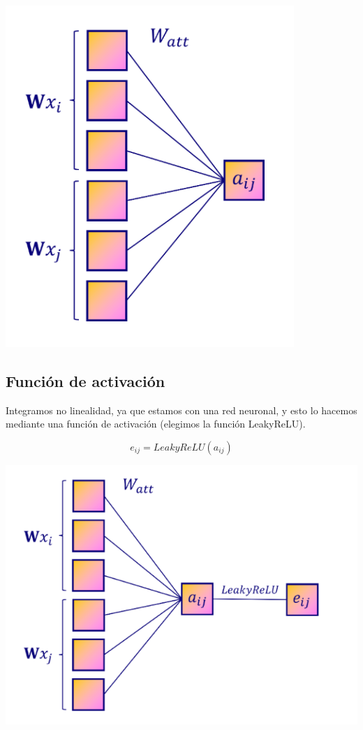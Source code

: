 \documentclass{article}
\begin{document}
\vspace{0.5cm}

\begin{center}
    \includegraphics[width=0.5\linewidth]{Watt.png}
\end{center}

\vspace{1cm}

\subsection{Función de activación}

\vspace{1cm}

Integramos no linealidad, ya que estamos con una red neuronal, y esto lo hacemos mediante una función de activación (elegimos la función LeakyReLU).

\vspace{0.5cm}

\begin{equation}
    e_{ij} = LeakyReLU(a_{ij})
\end{equation}

\vspace{0.5cm}

\begin{center}
    \includegraphics[width=0.75\linewidth]{foto2.png}
\end{center}
\end{document}
